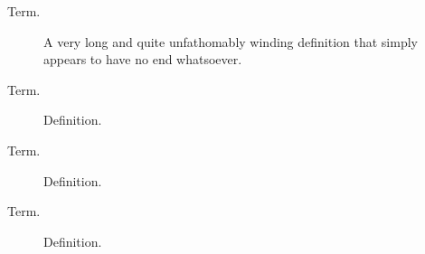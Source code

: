 \begin{description}
  \item[Term.] A very long and quite unfathomably winding definition that simply appears to have no end whatsoever.
  \item[Term.] Definition.
  \item[Term.] Definition.
  \item[Term.] Definition.
\end{description}
